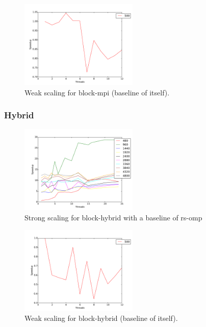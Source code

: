 \begin{figure}[ht]
\centering
\includegraphics[width=0.5\textwidth]{plots/weak_block-mpi.pdf}
\caption{Weak scaling for block-mpi (baseline of itself).}
\label{weak-block-mpi}
\end{figure}

\subsubsection{Hybrid}

\begin{figure}[ht]
\centering
\includegraphics[width=0.5\textwidth]{plots/strong_block-hybrid_baseline-rs-omp--1.pdf}
\caption{Strong scaling for block-hybrid with a baseline of rs-omp}
\label{strong-block-hybrid}
\end{figure}

\begin{figure}[ht]
\centering
\includegraphics[width=0.5\textwidth]{plots/weak_block-hybrid.pdf}
\caption{Weak scaling for block-hybrid (baseline of itself).}
\label{weak-block-hybrid}
\end{figure}

